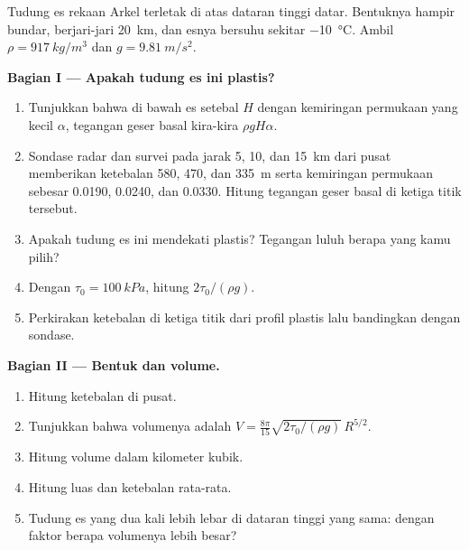 \begin{problem}
\label{pb:b3:glaciology:1}
Tudung es rekaan Arkel terletak di atas dataran tinggi datar. Bentuknya hampir bundar,
berjari-jari \qty{20}{km}, dan esnya bersuhu sekitar \qty{-10}{\celsius}. Ambil
$\rho = \qty{917}{kg/m^3}$ dan $g = \qty{9.81}{m/s^2}$.

\medskip\noindent\textbf{Bagian I --- Apakah tudung es ini plastis?}
\begin{enumerate}
\item Tunjukkan bahwa di bawah es setebal $H$ dengan kemiringan permukaan yang kecil
  $\alpha$, tegangan geser basal kira-kira $\rho gH\alpha$.
\item Sondase radar dan survei pada jarak 5, 10, dan \qty{15}{km} dari pusat
  memberikan ketebalan 580, 470, dan \qty{335}{m} serta kemiringan permukaan sebesar
  \num{0.0190}, \num{0.0240}, dan \num{0.0330}. Hitung tegangan geser basal
  di ketiga titik tersebut.
\item Apakah tudung es ini mendekati plastis? Tegangan luluh berapa yang kamu pilih?
\item Dengan $\tau_0 = \qty{100}{kPa}$, hitung $2\tau_0/(\rho g)$.
\item Perkirakan ketebalan di ketiga titik dari profil plastis
  lalu bandingkan dengan sondase.
\end{enumerate}

\medskip\noindent\textbf{Bagian II --- Bentuk dan volume.}
\begin{enumerate}[resume]
\item Hitung ketebalan di pusat.
\item Tunjukkan bahwa volumenya adalah $V = \frac{8\pi}{15}\sqrt{2\tau_0/(\rho
  g)}\,R^{5/2}$.
\item Hitung volume dalam kilometer kubik.
\item Hitung luas dan ketebalan rata-rata.
\item Tudung es yang dua kali lebih lebar di dataran tinggi yang sama: dengan faktor berapa
  volumenya lebih besar?
\end{enumerate}


\end{problem}
